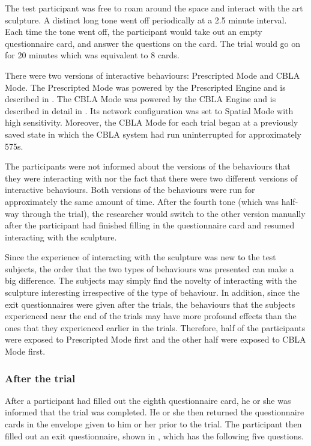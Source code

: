 The test participant was free to roam around the space and interact with the art sculpture. A distinct long tone went off periodically at a 2.5 minute interval. Each time the tone went off, the participant would take out an empty questionnaire card, and answer the questions on the card. The trial would go on for 20 minutes which was equivalent to 8 cards.

There were two versions of interactive behaviours: Prescripted Mode and CBLA Mode. The Prescripted Mode was powered by the Prescripted Engine and is described in . The CBLA Mode was powered by the CBLA Engine and is described in detail in . Its network configuration was set to Spatial Mode with high sensitivity. Moreover, the CBLA Mode for each trial began at a previously saved state in which the CBLA system had run uninterrupted for approximately 575s. 

The participants were not informed about the versions of the behaviours that they were interacting with nor the fact that there were two different versions of interactive behaviours. Both versions of the behaviours were run for approximately the same amount of time. After the fourth tone (which was half-way through the trial), the researcher would switch to the other version manually after the participant had finished filling in the questionnaire card and resumed interacting with the sculpture. 

Since the experience of interacting with the sculpture was new to the test subjects, the order that the two types of behaviours was presented can make a big difference. The subjects may simply find the novelty of interacting with the sculpture interesting irrespective of the type of behaviour. In addition, since the exit questionnaires were given after the trials, the behaviours that the subjects experienced near the end of the trials may have more profound effects than the ones that they experienced earlier in the trials. Therefore, half of the participants were exposed to Prescripted Mode first and the other half were exposed to CBLA Mode first.

\subsubsection{After the trial}

After a participant had filled out the eighth questionnaire card, he or she was informed that the trial was completed. He or she then returned the questionnaire cards in the envelope given to him or her prior to the trial. The participant then filled out an exit questionnaire, shown in , which has the following five questions.

